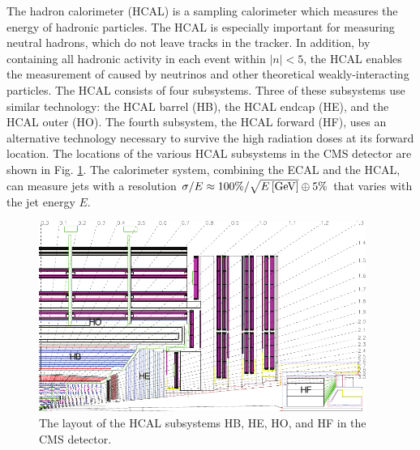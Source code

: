 The hadron calorimeter (HCAL) is a sampling calorimeter which measures the energy of hadronic particles. The HCAL is especially important for measuring neutral hadrons, which do not leave tracks in the tracker. In addition, by containing all hadronic activity in each event within $|n|<5$, the HCAL enables the measurement of \met caused by neutrinos and other theoretical weakly-interacting particles. The HCAL consists of four subsystems. Three of these subsystems use similar technology: the HCAL barrel (HB), the HCAL endcap (HE), and the HCAL outer (HO). The fourth subsystem, the HCAL forward (HF), uses an alternative technology necessary to survive the high radiation doses at its forward location. The locations of the various HCAL subsystems in the CMS detector are shown in Fig. \ref{fig:hcal-layout}. The calorimeter system, combining the ECAL and the HCAL, can measure jets with a resolution $\sigma/E \approx 100\% / \sqrt{E\,[\text{Ge\hspace{-.08em}V}]} \oplus 5\%$ that varies with the jet energy $E$.

\begin{figure}[hbt]
\begin{center}
\includegraphics[width=0.95\textwidth]{figures/HCAL_subdet.pdf}
\caption{The layout of the HCAL subsystems HB, HE, HO, and HF in the CMS detector.}
\label{fig:hcal-layout}
\end{center}
\end{figure}

